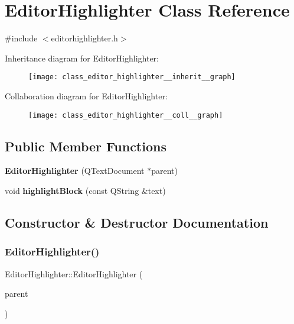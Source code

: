 \section{Editor\+Highlighter Class Reference}
\label{class_editor_highlighter}


{\ttfamily \#include $<$editorhighlighter.\+h$>$}



Inheritance diagram for Editor\+Highlighter\+:\nopagebreak
\begin{figure}[H]
\begin{center}
\leavevmode
\texttt{[image: class\_editor\_highlighter\_\_inherit\_\_graph]}
\end{center}
\end{figure}


Collaboration diagram for Editor\+Highlighter\+:\nopagebreak
\begin{figure}[H]
\begin{center}
\leavevmode
\texttt{[image: class\_editor\_highlighter\_\_coll\_\_graph]}
\end{center}
\end{figure}
\subsection*{Public Member Functions}
\begin{DoxyCompactItemize}
\item 
\textbf{ Editor\+Highlighter} (Q\+Text\+Document $\ast$parent)
\item 
void \textbf{ highlight\+Block} (const Q\+String \&text)
\end{DoxyCompactItemize}


\subsection{Constructor \& Destructor Documentation}
\mbox{\label{class_editor_highlighter_a73aaa3ba7c9c56cbf84f9446f3419ba5}} 
\subsubsection{Editor\+Highlighter()}
{\footnotesize\ttfamily Editor\+Highlighter\+::\+Editor\+Highlighter (\begin{DoxyParamCaption}\item[{Q\+Text\+Document $\ast$}]{parent }\end{DoxyParamCaption})}



